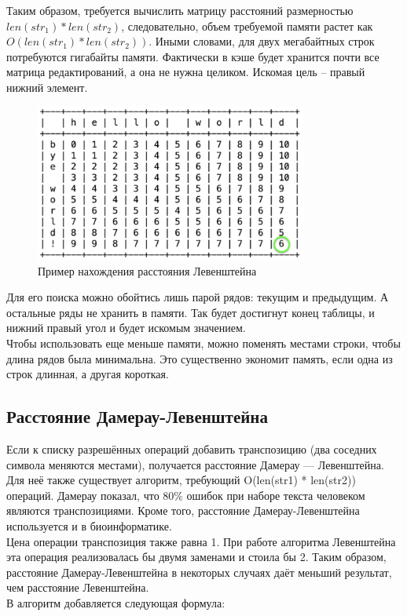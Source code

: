 \documentclass[a4paper,12pt]{article}
\begin{document}
Таким образом, требуется вычислить матрицу расстояний размерностью $len(str_1) * len(str_2)$, следовательно, объем требуемой памяти растет как $O(len(str_1) * len(str_2))$. Иными словами, для двух мегабайтных строк потребуются гигабайты памяти. Фактически в кэше будет хранится почти все матрица редактирований, а она не нужна целиком. Искомая цель – правый нижний элемент.\\[0.1cm]
\begin{figure} [H] %
	\centering    
    \includegraphics[width=0.8\textwidth]{exampleLeven.png} %
    \caption{Пример нахождения расстояния Левенштейна}
\end{figure}
Для его поиска можно обойтись лишь парой рядов: текущим и предыдущим. А остальные ряды не хранить в памяти. Так будет достигнут конец таблицы, и нижний правый угол и будет искомым значением.\\
Чтобы использовать еще меньше памяти, можно поменять местами строки, чтобы длина рядов была минимальна. Это существенно экономит память, если одна из строк длинная, а другая короткая.
\subsection{Расстояние Дамерау-Левенштейна}
Если к списку разрешённых операций добавить транспозицию (два соседних символа меняются местами), получается расстояние Дамерау — Левенштейна. Для неё также существует алгоритм, требующий O(len(str1) * len(str2)) операций. Дамерау показал, что 80\% ошибок при наборе текста человеком являются транспозициями. Кроме того, расстояние Дамерау-Левенштейна используется и в биоинформатике.\\
Цена операции транспозиция также равна 1. При работе алгоритма Левенштейна эта операция реализовалась бы двумя заменами и стоила бы 2. Таким образом, расстояние Дамерау-Левенштейна в некоторых случаях даёт меньший результат, чем расстояние Левенштейна.\\
В алгоритм добавляется следующая формула:\\
\end{document}
